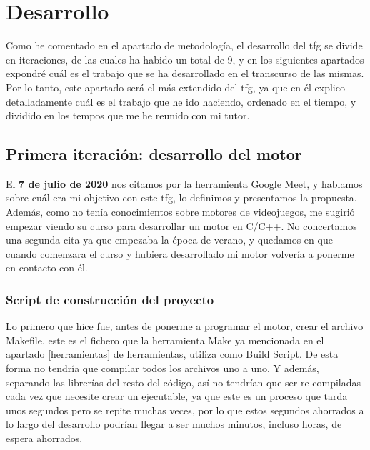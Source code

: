 
\chapter{Desarrollo}
\label{desarrollo}

Como he comentado en el apartado de metodología, el desarrollo del \gls{tfg} se divide en iteraciones, de las cuales ha habido un total de 9, y en los siguientes apartados expondré cuál es el trabajo que se ha desarrollado en el transcurso de las mismas.
Por lo tanto, este apartado será el más extendido del \gls{tfg}, ya que en él explico detalladamente cuál es el trabajo que he ido haciendo, ordenado en el tiempo, y dividido en los tempos que me he reunido con mi tutor.

\section{Primera iteración: desarrollo del motor}
El \textbf{7 de julio de 2020} nos citamos por la herramienta Google Meet, y hablamos sobre cuál era mi objetivo con este \gls{tfg}, lo definimos y presentamos la propuesta. Además, como no tenía conocimientos sobre motores de videojuegos, me sugirió empezar viendo su curso para desarrollar un motor en C/C++. No concertamos una segunda cita ya que empezaba la época de verano, y quedamos en que cuando comenzara el curso y hubiera desarrollado mi motor volvería a ponerme en contacto con él.

\subsection{Script de construcción del proyecto}
Lo primero que hice fue, antes de ponerme a programar el motor, crear el archivo Makefile, este es el fichero que la herramienta Make ya mencionada en el apartado \ref{herramientas} de herramientas, utiliza como Build Script. De esta forma no tendría que compilar todos los archivos uno a uno. Y además, separando las librerías del resto del código, así no tendrían que ser re-compiladas cada vez que necesite crear un ejecutable, ya que este es un proceso que tarda unos segundos pero se repite muchas veces, por lo que estos segundos ahorrados a lo largo del desarrollo podrían llegar a ser muchos minutos, incluso horas, de espera ahorrados.

